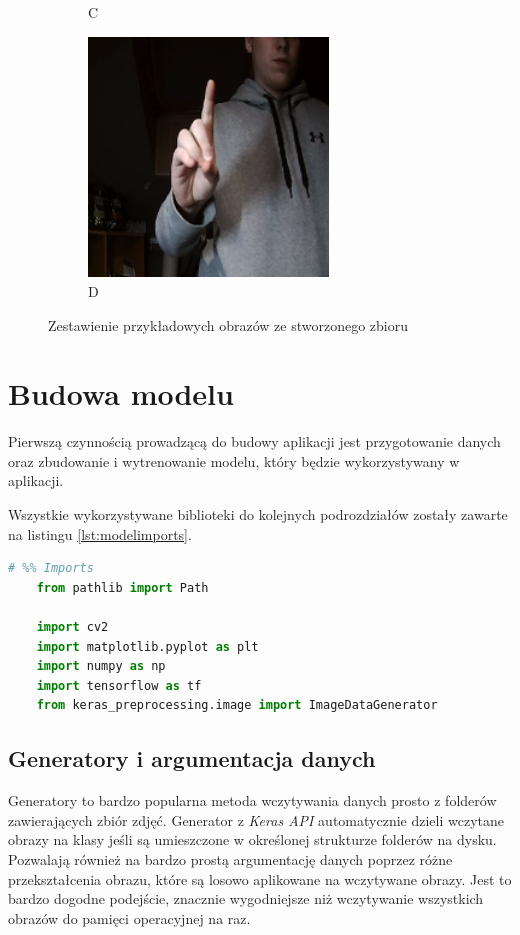 \documentclass[a4paper,12pt,oneside]{book} %
\begin{document}
\begin{figure}[h]
\begin{subfigure}{0.4\textwidth}
			\caption{C}
		\end{subfigure}
		\begin{subfigure}{0.4\textwidth}
			\centering
			\includegraphics[width=0.7\textwidth]{asl_d.png}
			\caption{D}
		\end{subfigure}
	\caption{Zestawienie przykładowych obrazów ze stworzonego zbioru}
	\label{asl_own_photos}
\end{figure}

\section{Budowa modelu}

Pierwszą czynnością prowadzącą do budowy aplikacji jest przygotowanie danych oraz zbudowanie i wytrenowanie modelu, który będzie wykorzystywany w aplikacji.

Wszystkie wykorzystywane biblioteki do kolejnych podrozdziałów zostały zawarte na listingu \ref{lst:modelimports}.

\begin{lstlisting}[language=Python, caption={Importowane biblioteki}, label={lst:modelimports}]
	# %% Imports
	from pathlib import Path
	
	import cv2
	import matplotlib.pyplot as plt
	import numpy as np
	import tensorflow as tf
	from keras_preprocessing.image import ImageDataGenerator
\end{lstlisting}

\subsection{Generatory i argumentacja danych}
Generatory to bardzo popularna metoda wczytywania danych prosto z folderów zawierających zbiór zdjęć. Generator z \emph{Keras API} automatycznie dzieli wczytane obrazy na klasy jeśli są umieszczone w określonej strukturze folderów na dysku. Pozwalają również na bardzo prostą argumentację danych poprzez różne przekształcenia obrazu, które są losowo aplikowane na wczytywane obrazy. Jest to bardzo dogodne podejście, znacznie wygodniejsze niż wczytywanie wszystkich obrazów do pamięci operacyjnej na raz.
\end{document}
